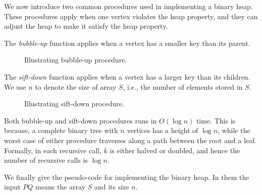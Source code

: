 We now introduce two common procedures used in implementing a binary heap.
These procedures apply when one vertex violates the heap property,
and they can adjust the heap to make it satisfy the heap property.

The \emph{bubble-up} function applies when a vertex has a smaller key than its parent.

\begin{minipage}{0.8\textwidth}
	\xxx
	\xxx
	\xxx
	\xxx
	\xxx
	\xxx
	\xxx
	\xxx
\end{minipage}

\begin{figure}[h!]
\centering{}
\caption{Illustrating bubble-up procedure.}
\end{figure}


The \emph{sift-down} function applies when a vertex has a larger key than its children.
We use $n$ to denote the size of array $S$, i.e., the number of elements stored in $S$.

\begin{minipage}{0.8\textwidth}
	\xxx
	\xxx
	\xxx
	\xxx
	\xxx
	\xxx
	\xxx
	\xxx
	\xxx
\end{minipage}

\begin{figure}[h!]
\centering{}
\caption{Illustrating sift-down procedure.}
\end{figure}

Both bubble-up and sift-down procedures runs in $O(\log n)$ time.
This is because, a complete binary tree with $n$ vertices has a height of $\log n$, while
the worst case of either procedure traverses along a path between the root and a leaf.
Formally, in each recursive call, $k$ is either halved or doubled, and hence the number
of recursive calls is $\log n$.



We finally give the pseudo-code for implementing the binary heap.
In them the input $PQ$ means the array $S$ and its size $n$.

